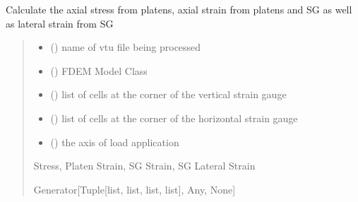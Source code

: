 \documentclass[letterpaper,10pt,english]{sphinxmanual}
\begin{document}
\begin{fulllineitems}
\label{\detokenize{pyfdempp:pyfdempp.complete_BD_thread_pool_generators.history_strain_func}}
\pysigstartsignatures
{}
\pysigstopsignatures
\sphinxAtStartPar
Calculate the axial stress from platens, axial strain from platens and SG as well as lateral strain from SG
\begin{quote}\begin{description}
\begin{itemize}
\item {} 
\sphinxAtStartPar
{} () \textendash{} name of vtu file being processed

\item {} 
\sphinxAtStartPar
{} () \textendash{} FDEM Model Class

\item {} 
\sphinxAtStartPar
{} (\sphinxstyleliteralemphasis{\sphinxupquote{{[}}}\sphinxstyleliteralemphasis{\sphinxupquote{{]}}}) \textendash{} list of cells at the corner of the vertical strain gauge

\item {} 
\sphinxAtStartPar
{} (\sphinxstyleliteralemphasis{\sphinxupquote{{[}}}\sphinxstyleliteralemphasis{\sphinxupquote{{]}}}) \textendash{} list of cells at the corner of the horizontal strain gauge

\item {} 
\sphinxAtStartPar
{} (\sphinxstyleliteralemphasis{\sphinxupquote{{[}}}\sphinxstyleliteralemphasis{\sphinxupquote{{]}}}) \textendash{} the axis of load application

\end{itemize}

\sphinxAtStartPar
Stress, Platen Strain, SG Strain, SG Lateral Strain

\sphinxAtStartPar
Generator{[}Tuple{[}list, list, list, list{]}, Any, None{]}

\end{description}\end{quote}

\end{fulllineitems}
\end{document}
